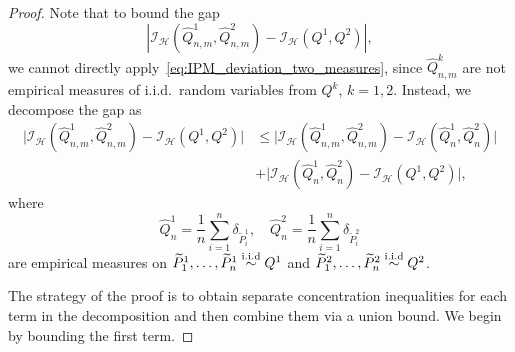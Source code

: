 \begin{proof}
Note that to bound the gap
\[
\left| \mathcal{I}_{\mathcal{H}}(\widehat{Q}^1_{n,m}, \widehat{Q}^2_{n,m}) - \mathcal{I}_{\mathcal{H}}(Q^1,Q^2) \right| ,
\]  
we cannot directly apply~\eqref{eq:IPM_deviation_two_measures}, since $\widehat{Q}^k_{n,m}$ are not empirical measures of i.i.d.\ random variables from $Q^k$, $k = 1,2$. Instead, we decompose the gap as 
\begin{align*}
\big| \mathcal{I}_{\mathcal{H}}(\widehat{Q}^1_{n,m}, \widehat{Q}^2_{n,m}) - \mathcal{I}_{\mathcal{H}}(Q^1,Q^2) \big| 
& \leq \big| \mathcal{I}_{\mathcal{H}}(\widehat{Q}^1_{n,m}, \widehat{Q}^2_{n,m}) - \mathcal{I}_{\mathcal{H}}(\widehat{Q}^1_n,\widehat{Q}^2_n) \big|\\
&+ \big| \mathcal{I}_{\mathcal{H}}(\widehat{Q}^1_n, \widehat{Q}^2_n) - \mathcal{I}_{\mathcal{H}}(Q^1,Q^2) \big|,
\end{align*}
where 
\[
\widehat{Q}^1_n = \frac{1}{n}\sum_{i = 1}^n \delta_{\widetilde{P}^1_i}, \quad \widehat{Q}^2_n = \frac{1}{n}\sum_{i = 1}^n \delta_{\widetilde{P}^2_i}
\]
are empirical measures on $\widetilde{P}^1_1,\dots,\widetilde{P}^1_n\overset{\mathrm{i.i.d}}{\sim} Q^1$ and
$\widetilde{P}^2_1,\dots,\widetilde{P}^2_n\overset{\mathrm{i.i.d}}{\sim} Q^2$.

The strategy of the proof is to obtain separate concentration inequalities for each term in the decomposition and then combine them via a union bound. We begin by bounding the first term.


\end{proof}
